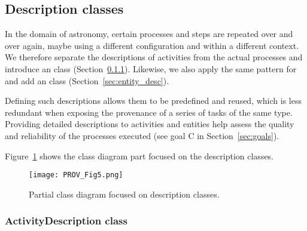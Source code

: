\subsection{Description classes}
\label{sec:descriptions}

In the domain of astronomy, certain processes and steps are repeated over and over again, maybe using a different configuration and within a different context. 
We therefore separate the descriptions of activities from the actual processes and introduce an  class (Section~\ref{sec:activity_desc}). 
Likewise, we also apply the same pattern for  and add an  class (Section~\ref{sec:entity_desc}). 

Defining such descriptions allows them to be predefined and reused, which is less redundant when exposing the provenance of a series of tasks of the same type. 
Providing detailed descriptions to activities and entities help assess the quality and reliability of the processes executed (see goal C in Section~\ref{sec:goals}).

Figure~\ref{fig:classdiagram_descriptions} shows the class diagram part focused on the description classes. 

\begin{figure}[ht]
\centering
\texttt{[image: PROV\_Fig5.png]}
\caption[Partial class diagram focused on description classes.]{Partial class diagram focused on description classes.}
\label{fig:classdiagram_descriptions}
\end{figure}


\subsubsection{ActivityDescription class}
\label{sec:activity_desc}


